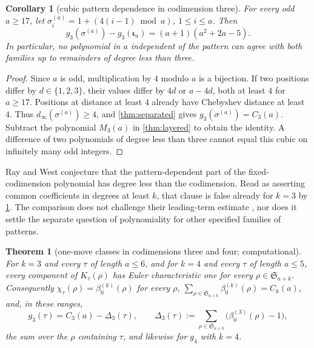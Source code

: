\documentclass[11pt,reqno]{amsart}
\theoremstyle{plain}
\newtheorem{theorem}{Theorem}[section]
\newtheorem{corollary}[corollary]{Corollary}
\theoremstyle{definition}
\theoremstyle{remark}
\let\greekiota\iota
\renewcommand{\iota}{\boldsymbol{\greekiota}}
\newcommand{\Sym}{\mathfrak{S}}
\newcommand{\bz}{\beta_0}
\begin{document}
\begin{corollary}[cubic pattern dependence in codimension three]\label{cor:cubic-spread}
For every odd $a\ge17$, let
$\sigma^{(a)}_i=1+(4(i-1)\bmod a)$, $1\le i\le a$. Then
\[
g_3(\sigma^{(a)})-g_3(\iota_a)
  =(a+1)(a^2+2a-5).
\]
In particular, no polynomial in $a$ independent of the pattern can
agree with both families up to remainders of degree less than three.
\end{corollary}

\begin{proof}
Since $a$ is odd, multiplication by $4$ modulo $a$ is a bijection.
If two positions differ by $d\in\{1,2,3\}$, their values differ by
$4d$ or $a-4d$, both at least $4$ for $a\ge17$. Positions at distance
at least $4$ already have Chebyshev distance at least $4$.
Thus $d_\infty(\sigma^{(a)})\ge4$, and \cref{thm:separated} gives
$g_3(\sigma^{(a)})=C_3(a)$. Subtract the polynomial $M_3(a)$ in
\cref{thm:layered} to obtain the identity. A difference of two
polynomials of degree less than three cannot equal this cubic on
infinitely many odd integers.
\end{proof}

Ray and West \cite[p.~57]{RayWest2003} conjecture that the
pattern-dependent part of the fixed-codimension polynomial has degree
less than the codimension. Read as asserting common coefficients
in degrees at least $k$, that clause is false already for $k=3$ by
\cref{cor:cubic-spread}. The comparison does not challenge their
leading-term estimate \cite[Cor.~9.5]{RayWest2003}, nor does it settle the separate
question of polynomiality for other specified families of patterns.

\begin{theorem}[one-move classes in codimensions three and four; computational]\label{thm:k34}
For $k=3$ and every $\tau$ of length $a\le6$, and for $k=4$ and every $\tau$ of length $a\le5$, every component of $K_\tau(\rho)$ has Euler characteristic one for every $\rho\in\Sym_{a+k}$. Consequently $\chi_\tau(\rho)=\bz^{(k)}(\rho)$ for every $\rho$, $\sum_{\rho\in\Sym_{a+k}}\bz^{(k)}(\rho)=C_k(a)$, and, in these ranges,
\begin{equation}\label{eq:g3classes}
g_3(\tau)=C_3(a)-\Delta_3(\tau),\qquad \Delta_3(\tau):=\sum_{\rho\in\Sym_{a+3}}\bigl(\bz^{(3)}(\rho)-1\bigr),
\end{equation}
the sum over the $\rho$ containing $\tau$, and likewise for $g_4$ with $k=4$.
\end{theorem}
\end{document}
